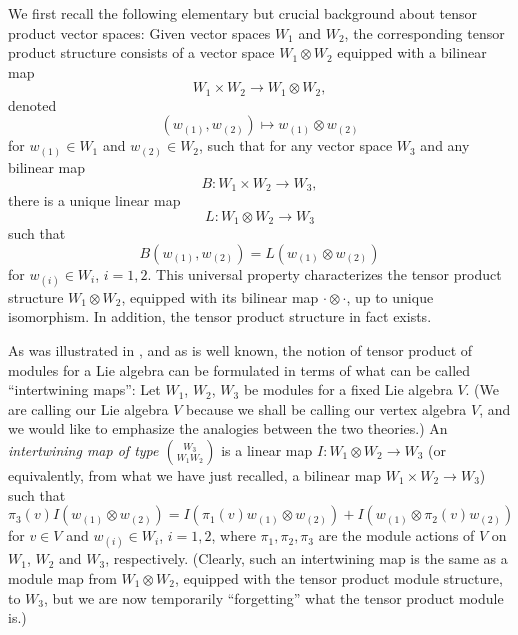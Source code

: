 \documentclass[12pt]{article}
\begin{document}
We first recall the following elementary but crucial background about
tensor product vector spaces: Given vector spaces $W_1$ and $W_2$, the
corresponding tensor product structure consists of a vector space $W_1
\otimes W_2$ equipped with a bilinear map
$$W_1 \times W_2 \longrightarrow W_1 \otimes W_2,$$
denoted
$$(w_{(1)},w_{(2)}) \mapsto w_{(1)}\otimes w_{(2)}$$
for $w_{(1)}\in W_1$ and $w_{(2)}\in W_2$, such that for any vector
space $W_3$ and any bilinear map
$$B:W_1 \times W_2 \longrightarrow W_3,$$
there is a unique linear map
$$L:W_1 \otimes W_2 \longrightarrow W_3$$
such that
$$B(w_{(1)},w_{(2)}) = L(w_{(1)}\otimes w_{(2)})$$
for $w_{(i)}\in W_i$, $i=1, 2$.  This universal property characterizes the
tensor product structure $W_1 \otimes W_2$, equipped with its bilinear
map $\cdot \otimes \cdot$, up to unique isomorphism.  In addition, the
tensor product structure in fact exists.

As was illustrated in \cite{tensorK}, and as is well known, the notion
of tensor product of modules for a Lie algebra can be formulated in
terms of what can be called ``intertwining maps'': Let $W_1$, $W_2$,
$W_3$ be modules for a fixed Lie algebra $V$.  (We are calling our Lie
algebra $V$ because we shall be calling our vertex algebra $V$, and we
would like to emphasize the analogies between the two theories.)  An
{\it intertwining map of type ${W_3 \choose {W_1 W_2}}$} is a linear
map $I: W_1 \otimes W_2 \longrightarrow W_3$ (or equivalently, {}from
what we have just recalled, a bilinear map $W_1 \times W_2
\longrightarrow W_3$) such that
\begin{equation}\label{intwmap}
\pi_3 (v)I(w_{(1)}\otimes w_{(2)})=I(\pi_1 (v)w_{(1)}\otimes
w_{(2)})+I(w_{(1)}\otimes \pi_2 (v)w_{(2)})
\end{equation}
for $v\in V$ and $w_{(i)}\in W_i$, $i=1,2$, where $\pi_1, \pi_2,
\pi_3$ are the module actions of $V$ on $W_1$, $W_2$ and $W_3$,
respectively.  (Clearly, such an intertwining map is the same as a
module map {}from $W_1\otimes W_2$, equipped with the tensor product
module structure, to $W_3$, but we are now temporarily ``forgetting''
what the tensor product module is.)
\end{document}
